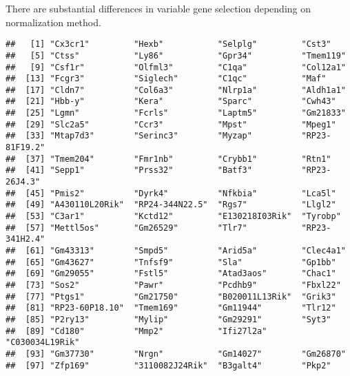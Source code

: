 \documentclass[
]{article}
\newenvironment{Shaded}{\begin{snugshade}}{\end{snugshade}}
\newcommand{\KeywordTok}[1]{\textcolor[rgb]{0.13,0.29,0.53}{\textbf{#1}}}
\newcommand{\NormalTok}[1]{#1}
\newcommand{\OperatorTok}[1]{\textcolor[rgb]{0.81,0.36,0.00}{\textbf{#1}}}
\newcommand{\StringTok}[1]{\textcolor[rgb]{0.31,0.60,0.02}{#1}}
\begin{document}
There are substantial differences in variable gene selection depending
on normalization method.

\begin{Shaded}
\end{Shaded}

\begin{verbatim}
##   [1] "Cx3cr1"         "Hexb"           "Selplg"         "Cst3"          
##   [5] "Ctss"           "Ly86"           "Gpr34"          "Tmem119"       
##   [9] "Csf1r"          "Olfml3"         "C1qa"           "Col12a1"       
##  [13] "Fcgr3"          "Siglech"        "C1qc"           "Maf"           
##  [17] "Cldn7"          "Col6a3"         "Nlrp1a"         "Aldh1a1"       
##  [21] "Hbb-y"          "Kera"           "Sparc"          "Cwh43"         
##  [25] "Lgmn"           "Fcrls"          "Laptm5"         "Gm21833"       
##  [29] "Slc2a5"         "Ccr3"           "Mpst"           "Mpeg1"         
##  [33] "Mtap7d3"        "Serinc3"        "Myzap"          "RP23-81F19.2"  
##  [37] "Tmem204"        "Fmr1nb"         "Crybb1"         "Rtn1"          
##  [41] "Sepp1"          "Prss32"         "Batf3"          "RP23-26J4.3"   
##  [45] "Pmis2"          "Dyrk4"          "Nfkbia"         "Lca5l"         
##  [49] "A430110L20Rik"  "RP24-344N22.5"  "Rgs7"           "Llgl2"         
##  [53] "C3ar1"          "Kctd12"         "E130218I03Rik"  "Tyrobp"        
##  [57] "Mettl5os"       "Gm26529"        "Tlr7"           "RP23-341H2.4"  
##  [61] "Gm43313"        "Smpd5"          "Arid5a"         "Clec4a1"       
##  [65] "Gm43627"        "Tnfsf9"         "Sla"            "Gp1bb"         
##  [69] "Gm29055"        "Fstl5"          "Atad3aos"       "Chac1"         
##  [73] "Sos2"           "Pawr"           "Pcdhb9"         "Fbxl22"        
##  [77] "Ptgs1"          "Gm21750"        "B020011L13Rik"  "Grik3"         
##  [81] "RP23-60P18.10"  "Tmem169"        "Gm11944"        "Tlr12"         
##  [85] "P2ry13"         "Mylip"          "Gm29291"        "Syt3"          
##  [89] "Cd180"          "Mmp2"           "Ifi27l2a"       "C030034L19Rik" 
##  [93] "Gm37730"        "Nrgn"           "Gm14027"        "Gm26870"       
##  [97] "Zfp169"         "3110082J24Rik"  "B3galt4"        "Pkp2"          

\end{verbatim}
\end{document}
